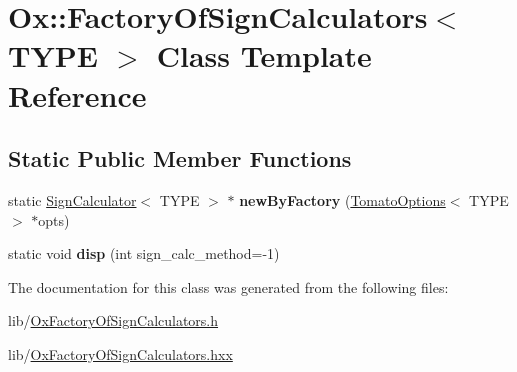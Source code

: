\hypertarget{class_ox_1_1_factory_of_sign_calculators}{}\section{Ox\+:\+:Factory\+Of\+Sign\+Calculators$<$ T\+Y\+PE $>$ Class Template Reference}
\label{class_ox_1_1_factory_of_sign_calculators}
\subsection*{Static Public Member Functions}
\begin{DoxyCompactItemize}
\item 
static \hyperlink{class_ox_1_1_sign_calculator}{Sign\+Calculator}$<$ T\+Y\+PE $>$ $\ast$ {\bfseries new\+By\+Factory} (\hyperlink{class_ox_1_1_tomato_options}{Tomato\+Options}$<$ T\+Y\+PE $>$ $\ast$opts)\hypertarget{class_ox_1_1_factory_of_sign_calculators_a1241354771109d5dbd3ffb3d6ec817a3}{}\label{class_ox_1_1_factory_of_sign_calculators_a1241354771109d5dbd3ffb3d6ec817a3}

\item 
static void {\bfseries disp} (int sign\+\_\+calc\+\_\+method=-\/1)\hypertarget{class_ox_1_1_factory_of_sign_calculators_a1230de323f020ee2f5bef7d93636c6f2}{}\label{class_ox_1_1_factory_of_sign_calculators_a1230de323f020ee2f5bef7d93636c6f2}

\end{DoxyCompactItemize}


The documentation for this class was generated from the following files\+:\begin{DoxyCompactItemize}
\item 
lib/\hyperlink{_ox_factory_of_sign_calculators_8h}{Ox\+Factory\+Of\+Sign\+Calculators.\+h}\item 
lib/\hyperlink{_ox_factory_of_sign_calculators_8hxx}{Ox\+Factory\+Of\+Sign\+Calculators.\+hxx}\end{DoxyCompactItemize}
